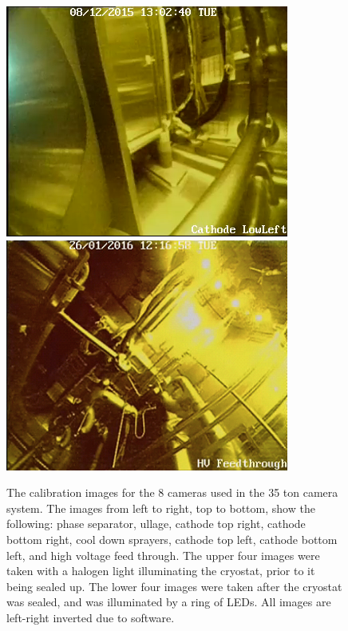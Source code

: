 \begin{figure}
   \includegraphics[width=\linewidth]{cathodell}
 \endminipage
   \includegraphics[width=\linewidth]{hvft}
 \endminipage
 \caption[The calibration images for the 8 cameras used in the 35 ton camera system]
         {The calibration images for the 8 cameras used in the 35 ton camera system.  The images from left to right, top to bottom, show the following: phase separator, ullage, cathode top right, cathode bottom right, cool down sprayers, cathode top left, cathode bottom left, and high voltage feed through.  The upper four images were taken with a halogen light illuminating the cryostat, prior to it being sealed up.  The lower four images were taken after the cryostat was sealed, and was illuminated by a ring of LEDs.  All images are left-right inverted due to software.}
 \label{fig:CamFOV}
\end{figure}

